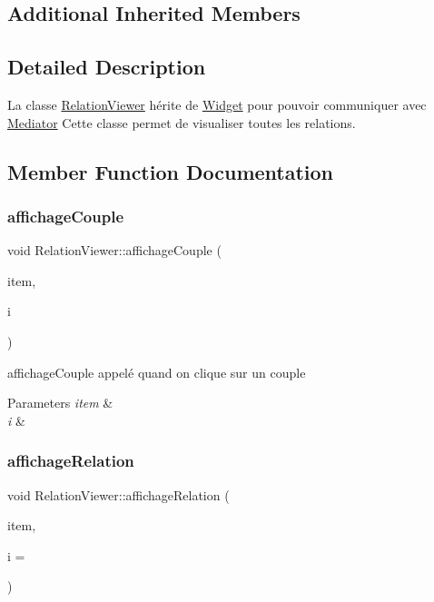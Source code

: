 \subsection*{Additional Inherited Members}


\subsection{Detailed Description}
La classe \hyperlink{classRelationViewer}{Relation\+Viewer} hérite de \hyperlink{classWidget}{Widget} pour pouvoir communiquer avec \hyperlink{classMediator}{Mediator} Cette classe permet de visualiser toutes les relations. 

\subsection{Member Function Documentation}
\mbox{\label{classRelationViewer_ad0771f0bf9198b53ad8e0d77b4425e93}} 
\subsubsection{\texorpdfstring{affichage\+Couple}{affichageCouple}}
{\footnotesize\ttfamily void Relation\+Viewer\+::affichage\+Couple (\begin{DoxyParamCaption}\item[{Q\+Tree\+Widget\+Item $\ast$}]{item,  }\item[{int}]{i }\end{DoxyParamCaption})\hspace{0.3cm}{\ttfamily [slot]}}



affichage\+Couple appelé quand on clique sur un couple 


\begin{DoxyParams}{Parameters}
{\em item} & \\
\hline
{\em i} & \\
\hline
\end{DoxyParams}
\mbox{\label{classRelationViewer_ac357dab8075b96af014ad4dd70a1a7dd}} 
\subsubsection{\texorpdfstring{affichage\+Relation}{affichageRelation}}
{\footnotesize\ttfamily void Relation\+Viewer\+::affichage\+Relation (\begin{DoxyParamCaption}\item[{Q\+Tree\+Widget\+Item $\ast$}]{item,  }\item[{int}]{i = {} }\end{DoxyParamCaption})\hspace{0.3cm}{\ttfamily [slot]}}



